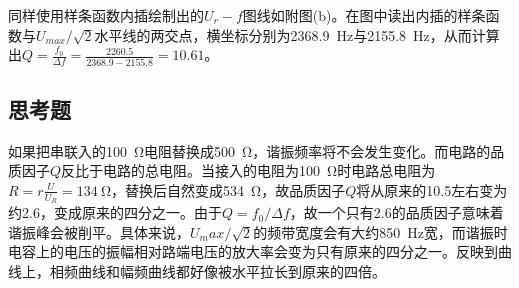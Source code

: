 \documentclass[UTF8]{ctexart}
\begin{document}
同样使用样条函数内插绘制出的$U_r-f$图线如附图(b)。在图中读出内插的样条函数与$U_{max}/\sqrt{2}$水平线的两交点，横坐标分别为\SI{2368.9}{\Hz}与\SI{2155.8}{\Hz}，从而计算出$Q=\frac{f_0}{\Delta f}=\frac{2260.5}{2368.9-2155.8}=10.61$。
\subsection{思考题}
如果把串联入的\SI{100}{\ohm}电阻替换成\SI{500}{\ohm}，谐振频率将不会发生变化。而电路的品质因子$Q$反比于电路的总电阻。当接入的电阻为\SI{100}{\ohm}时电路总电阻为$R=r\frac{U}{U_R}=\SI{134}{\ohm}$，替换后自然变成\SI{534}{\ohm}，故品质因子$Q$将从原来的10.5左右变为约2.6，变成原来的四分之一。由于$Q=f_0/\Delta f$，故一个只有2.6的品质因子意味着谐振峰会被削平。具体来说，$U_max/\sqrt{2}$的频带宽度会有大约\SI{850}{\Hz}宽，而谐振时电容上的电压的振幅相对路端电压的放大率会变为只有原来的四分之一。反映到曲线上，相频曲线和幅频曲线都好像被水平拉长到原来的四倍。
\end{document}
